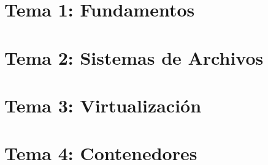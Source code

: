\renewcommand{\contentsname}{Indice}
\tableofcontents
\newpage
\section{Tema 1: Fundamentos}

\newpage
\section{Tema 2: Sistemas de Archivos}

\newpage
\section{Tema 3: Virtualización}

\newpage
\section{Tema 4: Contenedores}

